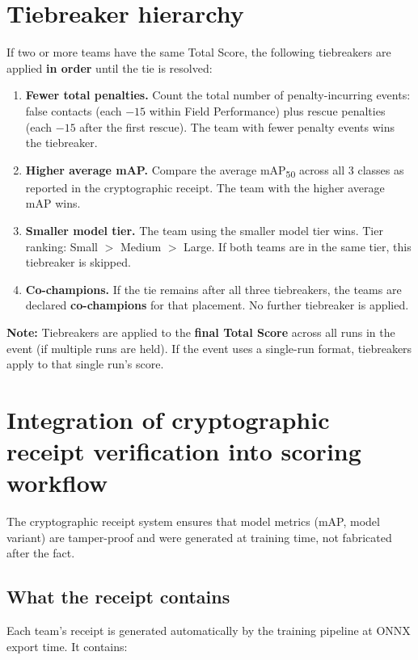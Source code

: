 \documentclass[a4]{article}
\begin{document}
\section*{Tiebreaker hierarchy}
If two or more teams have the same Total Score, the following tiebreakers are applied \textbf{in order} until the tie is resolved:

\begin{enumerate}
    \item \textbf{Fewer total penalties.} Count the total number of penalty-incurring events: false contacts (each $-15$ within Field Performance) plus rescue penalties (each $-15$ after the first rescue). The team with fewer penalty events wins the tiebreaker.

    \item \textbf{Higher average mAP.} Compare the average mAP\textsubscript{50} across all 3 classes as reported in the cryptographic receipt. The team with the higher average mAP wins.

    \item \textbf{Smaller model tier.} The team using the smaller model tier wins. Tier ranking: Small $>$ Medium $>$ Large. If both teams are in the same tier, this tiebreaker is skipped.

    \item \textbf{Co-champions.} If the tie remains after all three tiebreakers, the teams are declared \textbf{co-champions} for that placement. No further tiebreaker is applied.
\end{enumerate}

\textbf{Note:} Tiebreakers are applied to the \textbf{final Total Score} across all runs in the event (if multiple runs are held). If the event uses a single-run format, tiebreakers apply to that single run's score.

\section*{Integration of cryptographic receipt verification into scoring workflow}
The cryptographic receipt system ensures that model metrics (mAP, model variant) are tamper-proof and were generated at training time, not fabricated after the fact.

\subsection*{What the receipt contains}

Each team's receipt is generated automatically by the training pipeline at ONNX export time. It contains:
\end{document}
